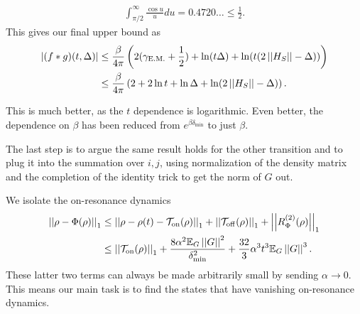 \documentclass[
 amsmath,amssymb,
 aps,
onecolumn, 
nofootinbib]{revtex4-2}
\newcommand{\on}{\rm on}
\newcommand{\off}{\rm off}
\newcommand{\abs}[1]{\left| #1 \right|}
\newcommand{\norm}[1]{\left|\left| #1 \right|\right|}
\newcommand{\EE}{\mathbb{E}}
\begin{document}
\begin{align}
    \int_{\pi / 2}^{\infty} \frac{\cos u}{u} du = 0.4720\ldots \le \frac{1}{2}.
\end{align}
This gives our final upper bound as
\begin{align}
    \abs{(f * g)(t, \Delta)} &\le \frac{\beta}{4 \pi} \left( 2 (\gamma_{\rm E.M.} + \frac{1}{2}) + \ln (t \Delta) + \ln (t (2 \norm{H_S} - \Delta))   \right) \\
    &\le \frac{\beta}{4\pi} \left(2 + 2\ln t + \ln \Delta + \ln (2 \norm{H_S} - \Delta)  \right).
\end{align}

This is much better, as the $t$ dependence is logarithmic. Even better, the dependence on $\beta$ has been reduced from $e^{\beta \delta_{\min}}$ to just $\beta$. 

The last step is to argue the same result holds for the other transition and to plug it into the summation over $i,j$, using normalization of the density matrix and the completion of the identity trick to get the norm of $G$ out. 

We isolate the on-resonance dynamics
\begin{align}
    \norm{\rho - \Phi(\rho)}_1 &\le \norm{\rho - \rho(t) - \mathcal{T}_{\rm on}(\rho)}_1 + \norm{\mathcal{T}_{\off}(\rho)}_1 + \norm{R_{\Phi}^{(2)}(\rho)}_1 \\
    &\le \norm{\mathcal{T}_{\on}(\rho)}_1 + \frac{8 \alpha^2 \EE_G \norm{G}^2}{ \delta_{\min}^2} + \frac{32}{3} \alpha^3 t^3 \EE_G \norm{G}^3.
\end{align}
These latter two terms can always be made arbitrarily small by sending $\alpha \to 0$. This means our main task is to find the states that have vanishing on-resonance dynamics.
\end{document}
